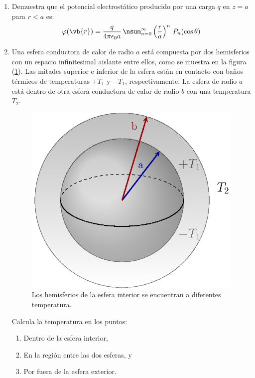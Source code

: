 \begin{enumerate}
\item Demuestra que el potencial electrostático producido por una carga $q$ en $z = a$ para $r < a$ es:
\begin{align*}
\varphi(\vb{r}) = \dfrac{q}{4 \pi \epsilon_{0} a} \, \nsum_{n=0}^{\infty} \left( \dfrac{r}{a} \right)^{n} \, P_{n}(\cos \theta)
\end{align*}
\item Una esfera conductora de calor de radio $a$ está compuesta por dos hemisferios con un espacio infinitesimal aislante entre ellos, como se muestra en la figura (\ref{fig:figura2}). Las mitades superior e inferior de la esfera están en contacto con baños térmicos de temperaturas $+ T_{1}$ y $-T_{1}$, respectivamente. La esfera de radio $a$ está dentro de otra esfera conductora de calor de radio $b$ con una temperatura $T_{2}$.
\begin{figure}[H]
    \centering
   \includegraphics[scale=0.8]{Imagenes/esfera1.eps}
    \caption{Los hemisferios de la esfera interior se encuentran a diferentes temperatura.}
    \label{fig:figura2}
\end{figure}
Calcula la temperatura en los puntos:
\begin{enumerate}[label=\roman*)]
\item Dentro de la esfera interior,
\item En la región entre las dos esferas, y
\item Por fuera de la esfera exterior.

\end{enumerate}
\end{enumerate}
